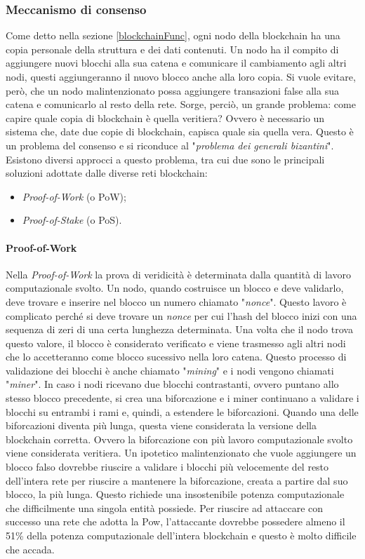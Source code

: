 \documentclass[a4paper]{article}
\begin{document}
    \subsubsection{Meccanismo di consenso}
    Come detto nella sezione \ref{blockchainFunc}, ogni nodo della blockchain ha una copia personale della struttura e dei dati contenuti. Un nodo ha il compito di aggiungere nuovi blocchi alla sua catena e comunicare il cambiamento agli altri nodi, questi aggiungeranno il nuovo blocco anche alla loro copia.
    Si vuole evitare, però, che un nodo malintenzionato possa aggiungere transazioni false alla sua catena e comunicarlo al resto della rete.
    Sorge, perciò, un grande problema: come capire quale copia di blockchain è quella veritiera? Ovvero è necessario un sistema che, date due copie di blockchain, capisca quale sia quella vera. Questo è un problema del consenso e si riconduce al "\emph{problema dei generali bizantini}".
    Esistono diversi approcci a questo problema, tra cui due sono le principali soluzioni adottate dalle diverse reti blockchain:
    \begin{itemize}
      \item \emph{Proof-of-Work} (o PoW);
      \item \emph{Proof-of-Stake} (o PoS).
    \end{itemize}
    \paragraph{Proof-of-Work}
    Nella \emph{Proof-of-Work} la prova di veridicità è determinata dalla quantità di lavoro computazionale svolto. Un nodo, quando costruisce un blocco e deve validarlo, deve trovare e inserire nel blocco un numero chiamato "\emph{nonce}".
    Questo lavoro è complicato perché si deve trovare un \emph{nonce} per cui l'hash del blocco inizi con una sequenza di zeri di una certa lunghezza determinata. Una volta che il nodo trova questo valore, il blocco è considerato verificato e viene trasmesso agli altri nodi che lo accetteranno come blocco sucessivo nella loro catena.
    Questo processo di validazione dei blocchi è anche chiamato "\emph{mining}" e i nodi vengono chiamati "\emph{miner}".
    In caso i nodi ricevano due blocchi contrastanti, ovvero puntano allo stesso blocco precedente, si crea una biforcazione e i miner continuano a validare i blocchi su entrambi i rami e, quindi, a estendere le biforcazioni. Quando una delle biforcazioni
    diventa più lunga, questa viene considerata la versione della blockchain corretta. Ovvero la biforcazione con più lavoro computazionale svolto viene considerata veritiera. 
    Un ipotetico malintenzionato che vuole aggiungere un blocco falso dovrebbe riuscire a validare i blocchi più velocemente del resto dell'intera rete per riuscire a mantenere la biforcazione, creata a partire dal suo blocco, la più lunga. Questo richiede una insostenibile potenza computazionale che difficilmente una singola entità possiede.
    Per riuscire ad attaccare con successo una rete che adotta la Pow, l'attaccante dovrebbe possedere almeno il 51\% della potenza computazionale dell'intera blockchain e questo è molto difficile che accada.
\end{document}
